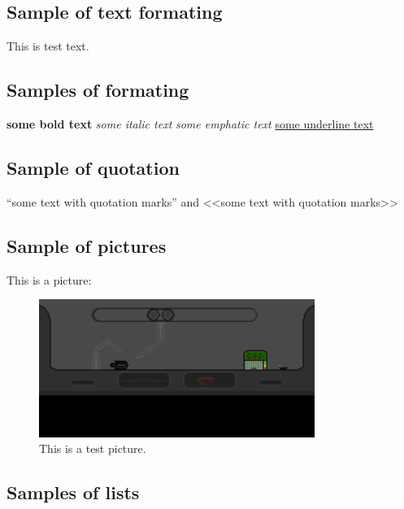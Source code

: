 %
%

\subsection{Sample of text formating}
This is test text.

\subsection{Samples of formating}
\textbf{some bold text}
\textit{some italic text}
\emph{some emphatic text}
\underline{some underline text}


\subsection{Sample of quotation}
``some text with quotation marks'' and  <<some text with quotation marks>>

\subsection{Sample of pictures}
This is a picture:
\begin{figure}[!hbtp]
    \begin{center}
    \includegraphics[width=0.8\textwidth]{pics/astro-ship-engener.png}
    \end{center}
    \caption{This is a test picture.\label{Picture_example}}
\end{figure}

\subsection{Samples of lists\label{List_examples}}

